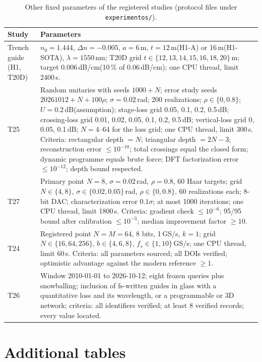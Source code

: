 \documentclass[11pt,a4paper]{article}
\newcommand{\dBcm}{\,dB/cm\xspace}
\newcommand{\um}{\,\textmu m\xspace}
\newcommand{\dB}{\,dB\xspace}
\begin{document}
\begin{table}[htbp]
\centering\small
\caption{Other fixed parameters of the registered studies (protocol files under \texttt{experimentos/}).}
\label{tab:otherparams}
\begin{tabularx}{\linewidth}{@{}l>{\raggedright\arraybackslash}X@{}}
\toprule
Study & Parameters \\
\midrule
Trench guide (H1, T20D) & $n_0=1.444$, $\Delta n=-0.005$, $a=6$\um, $t=12$\um (H1-A) or 16\um (H1-SOTA), $\lambda=1550$\,nm; T20D grid $t\in\{12,13,14,15,16,18,20\}$\um; target 0.006\dBcm (10\,\% of 0.06\dBcm); one CPU thread, limit 2400\,s. \\
T25 & Random unitaries with seeds $1000+N$; error study seeds $20261012+N+100\rho$; $\sigma=0.02$\,rad; 200 realizations; $\rho\in\{0,0.8\}$; $U=0.2$\dB (assumption); stage-loss grid 0.05, 0.1, 0.2, 0.5\dB; crossing-loss grid 0.01, 0.02, 0.05, 0.1, 0.2, 0.5\dB; vertical-loss grid 0, 0.05, 0.1\dB; $N=4$--64 for the loss grid; one CPU thread, limit 300\,s. Criteria: rectangular depth $=N$; triangular depth $=2N-3$; reconstruction error $\le10^{-10}$; total crossings equal the closed form; dynamic programme equals brute force; DFT factorization error $\le10^{-12}$; depth bound respected. \\
T27 & Primary point $N=8$, $\sigma=0.02$\,rad, $\rho=0.8$, 60 Haar targets; grid $N\in\{4,8\}$, $\sigma\in\{0.02,0.05\}$\,rad, $\rho\in\{0,0.8\}$, 60 realizations each; 8-bit DAC; characterization error $0.1\sigma$; at most 1000 iterations; one CPU thread, limit 1800\,s. Criteria: gradient check $\le10^{-6}$; 95/95 bound after calibration $\le10^{-3}$; median improvement factor $\ge10$. \\
T24 & Registered point $N=M=64$, 8 bits, 1\,GS/s, $k=1$; grid $N\in\{16,64,256\}$, $b\in\{4,6,8\}$, $f_s\in\{1,10\}$\,GS/s; one CPU thread, limit 60\,s. Criteria: all parameters sourced; all DOIs verified; optimistic advantage against the modern reference $\ge1$. \\
T26 & Window 2010-01-01 to 2026-10-12; eight frozen queries plus snowballing; inclusion of fs-written guides in glass with a quantitative loss and its wavelength, or a programmable or 3D network; criteria: all identifiers verified; at least 8 verified records; every value located. \\
\bottomrule
\end{tabularx}
\end{table}

\FloatBarrier
\section{Additional tables}
\label{app:results}
\end{document}
